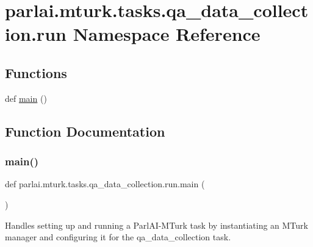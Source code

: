 \hypertarget{namespaceparlai_1_1mturk_1_1tasks_1_1qa__data__collection_1_1run}{}\section{parlai.\+mturk.\+tasks.\+qa\+\_\+data\+\_\+collection.\+run Namespace Reference}
\label{namespaceparlai_1_1mturk_1_1tasks_1_1qa__data__collection_1_1run}
\subsection*{Functions}
\begin{DoxyCompactItemize}
\item 
def \hyperlink{namespaceparlai_1_1mturk_1_1tasks_1_1qa__data__collection_1_1run_a461bad0b4f8f16a8ea54e7231ad8848b}{main} ()
\end{DoxyCompactItemize}


\subsection{Function Documentation}
\mbox{\label{namespaceparlai_1_1mturk_1_1tasks_1_1qa__data__collection_1_1run_a461bad0b4f8f16a8ea54e7231ad8848b}} 
\subsubsection{\texorpdfstring{main()}{main()}}
{\footnotesize\ttfamily def parlai.\+mturk.\+tasks.\+qa\+\_\+data\+\_\+collection.\+run.\+main (\begin{DoxyParamCaption}{ }\end{DoxyParamCaption})}

\begin{DoxyVerb}Handles setting up and running a ParlAI-MTurk task by instantiating an MTurk manager
and configuring it for the qa_data_collection task.
\end{DoxyVerb}
 
